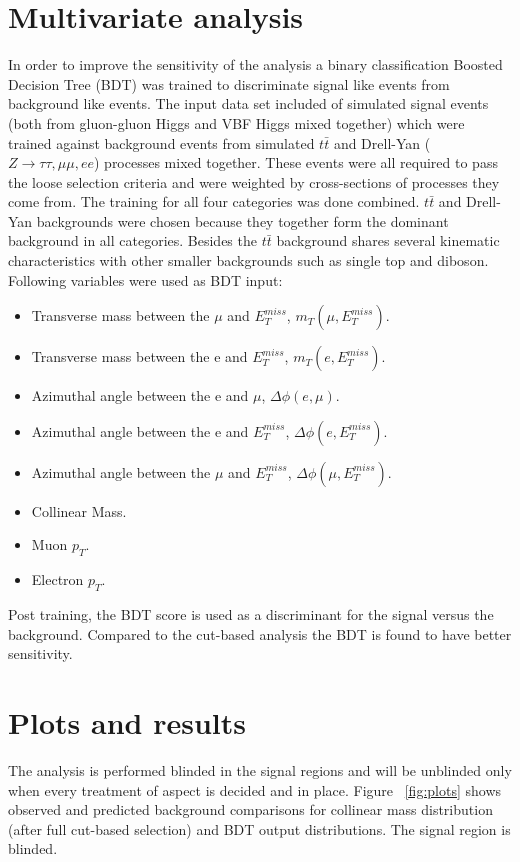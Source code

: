 \documentclass[a4paper,11pt]{article}
\begin{document}
\section {Multivariate analysis}
In order to improve the sensitivity of the analysis a binary classification Boosted Decision Tree (BDT) was trained to discriminate signal like events from background like events. The input data set included of simulated signal events (both from gluon-gluon Higgs and VBF Higgs mixed together) which were trained against background events from simulated $t\bar{t}$ and Drell-Yan ($Z\rightarrow \tau\tau,\mu\mu,ee$) processes mixed together. These events were all required to pass the loose selection criteria and were weighted by cross-sections of processes they come from. The training for all four categories was done combined. $t\bar{t}$ and Drell-Yan backgrounds were chosen because they together form the dominant background in all categories. Besides the $t\bar{t}$ background shares several kinematic characteristics with other smaller backgrounds such as single top and diboson. Following variables were used as BDT input:
\begin{itemize} 
\item Transverse mass between the $\mu$ and $E_{T}^{miss}$, $m_{T}(\mu, E_{T}^{miss})$.
\item Transverse mass between the e and $E_{T}^{miss}$, $m_{T}(e, E_{T}^{miss})$.
\item Azimuthal angle between the e and $\mu$, $\Delta\phi(e,\mu)$.
\item Azimuthal angle between the e and $E_{T}^{miss}$, $\Delta\phi(e, E_{T}^{miss})$.
\item Azimuthal angle between the $\mu$ and $E_{T}^{miss}$, $\Delta\phi(\mu,E_{T}^{miss})$.
\item Collinear Mass. 
\item Muon $p_{T}$.
\item Electron $p_{T}$.
\end{itemize}
Post training, the BDT score is used as a discriminant for the signal versus the background. Compared to the cut-based analysis the BDT is found to have better sensitivity.

\section {Plots and results}
The analysis is performed blinded in the signal regions and will be unblinded only when every treatment of aspect is decided and in place. Figure ~\ref{fig:plots} shows observed and predicted background comparisons for collinear mass distribution (after full cut-based selection) and BDT output distributions. The signal region is blinded. \\
\end{document}
